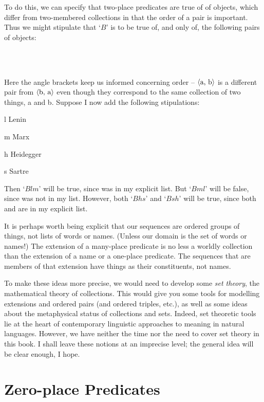 To do this, we can specify that two-place predicates are true of  of objects, which differ from two-membered collections in that the order of a pair is important. Thus we might stipulate that `$B$' is to be true of, and only of, the following pairs of objects:
	\begin{center}
		\\
		\\
	\end{center}
Here the angle brackets keep us informed concerning order – $\mbox{\ensuremath{\mathopen{\langle}}a, b\ensuremath{\mathclose{\rangle}}}$ is a different pair from $\mbox{\ensuremath{\mathopen{\langle}}b, a\ensuremath{\mathclose{\rangle}}}$ even though they correspond to the same collection of two things, a and b. Suppose I now add the following stipulations:
	\begin{ekey}
		\item[l] Lenin
		\item[m] Marx
		\item[h] Heidegger
		\item[s] Sartre
	\end{ekey}
Then `$Blm$' will be true, since  was in my explicit list. But `$Bml$' will be false, since  was not in my list. However, both `$Bhs$' and `$Bsh$' will be true, since both  and  are in my explicit list. 

It is perhaps worth being explicit that our sequences are ordered groups of things, not lists of words or names. (Unless our domain is the set of words or names!) The extension of a many-place predicate is no less a worldly collection than the extension of a name or a one-place predicate. The sequences that are members of that extension have things as their constituents, not names.

To make these ideas more precise, we would need to develop some \emph{set theory}, the mathematical theory of collections. This would give you some tools for modelling extensions and ordered pairs (and ordered triples, etc.), as well as some ideas about the metaphysical status of collections and sets. Indeed, set theoretic tools lie at the heart of contemporary linguistic approaches to meaning in natural languages. However, we have neither the time nor the need to cover set theory in this book. I shall leave these notions at an imprecise level; the general idea will be clear enough, I hope. 

\section{Zero-place Predicates}


